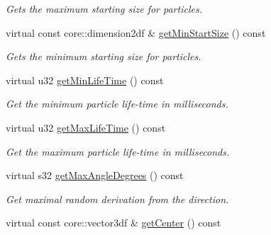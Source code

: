 \begin{DoxyCompactItemize}
\begin{DoxyCompactList}\small\item\em Gets the maximum starting size for particles. \end{DoxyCompactList}\item 
\hypertarget{classirr_1_1scene_1_1_c_particle_ring_emitter_a974ea6f9147fe06710569cec498244b0}{virtual const core\-::dimension2df \& \hyperlink{classirr_1_1scene_1_1_c_particle_ring_emitter_a974ea6f9147fe06710569cec498244b0}{get\-Min\-Start\-Size} () const }\label{classirr_1_1scene_1_1_c_particle_ring_emitter_a974ea6f9147fe06710569cec498244b0}

\begin{DoxyCompactList}\small\item\em Gets the minimum starting size for particles. \end{DoxyCompactList}\item 
\hypertarget{classirr_1_1scene_1_1_c_particle_ring_emitter_adbbc86f01dc3c00bf6ad542357806025}{virtual u32 \hyperlink{classirr_1_1scene_1_1_c_particle_ring_emitter_adbbc86f01dc3c00bf6ad542357806025}{get\-Min\-Life\-Time} () const }\label{classirr_1_1scene_1_1_c_particle_ring_emitter_adbbc86f01dc3c00bf6ad542357806025}

\begin{DoxyCompactList}\small\item\em Get the minimum particle life-\/time in milliseconds. \end{DoxyCompactList}\item 
\hypertarget{classirr_1_1scene_1_1_c_particle_ring_emitter_a2ccc35853d3198ee66cb2214a67ae5ae}{virtual u32 \hyperlink{classirr_1_1scene_1_1_c_particle_ring_emitter_a2ccc35853d3198ee66cb2214a67ae5ae}{get\-Max\-Life\-Time} () const }\label{classirr_1_1scene_1_1_c_particle_ring_emitter_a2ccc35853d3198ee66cb2214a67ae5ae}

\begin{DoxyCompactList}\small\item\em Get the maximum particle life-\/time in milliseconds. \end{DoxyCompactList}\item 
\hypertarget{classirr_1_1scene_1_1_c_particle_ring_emitter_a6bff26d587f79ef0ec0d83abd1e77d75}{virtual s32 \hyperlink{classirr_1_1scene_1_1_c_particle_ring_emitter_a6bff26d587f79ef0ec0d83abd1e77d75}{get\-Max\-Angle\-Degrees} () const }\label{classirr_1_1scene_1_1_c_particle_ring_emitter_a6bff26d587f79ef0ec0d83abd1e77d75}

\begin{DoxyCompactList}\small\item\em Get maximal random derivation from the direction. \end{DoxyCompactList}\item 
\hypertarget{classirr_1_1scene_1_1_c_particle_ring_emitter_addfe491c3bf123a780ba7280e1b98586}{virtual const core\-::vector3df \& \hyperlink{classirr_1_1scene_1_1_c_particle_ring_emitter_addfe491c3bf123a780ba7280e1b98586}{get\-Center} () const }\label{classirr_1_1scene_1_1_c_particle_ring_emitter_addfe491c3bf123a780ba7280e1b98586}


\end{DoxyCompactItemize}
